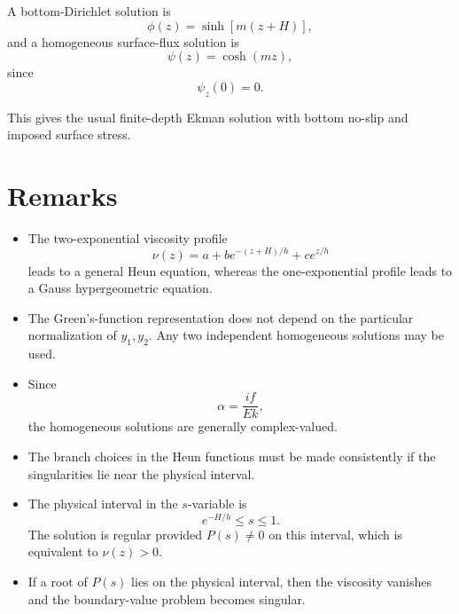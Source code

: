 \documentclass[10pt]{amsart}
\begin{document}
A bottom-Dirichlet solution is
\begin{equation}
\phi(z)=\sinh\!\left[m(z+H)\right],
\end{equation}
and a homogeneous surface-flux solution is
\begin{equation}
\psi(z)=\cosh(mz),
\end{equation}
since
\[
\psi_z(0)=0.
\]

This gives the usual finite-depth Ekman solution with bottom no-slip and imposed surface stress.

\section{Remarks}

\begin{itemize}
    \item The two-exponential viscosity profile
    \[
    \nu(z)=a+b e^{-(z+H)/h}+c e^{z/h}
    \]
    leads to a general Heun equation, whereas the one-exponential profile leads to a Gauss hypergeometric equation.

    \item The Green's-function representation does not depend on the particular normalization of \(y_1,y_2\). Any two independent homogeneous solutions may be used.

    \item Since
    \[
    \alpha=\frac{i f}{E k},
    \]
    the homogeneous solutions are generally complex-valued.

    \item The branch choices in the Heun functions must be made consistently if the singularities lie near the physical interval.

    \item The physical interval in the \(s\)-variable is
    \[
    e^{-H/h}\le s\le 1.
    \]
    The solution is regular provided \(P(s)\neq 0\) on this interval, which is equivalent to \(\nu(z)>0\).

    \item If a root of \(P(s)\) lies on the physical interval, then the viscosity vanishes and the boundary-value problem becomes singular.
\end{itemize}
\end{document}
